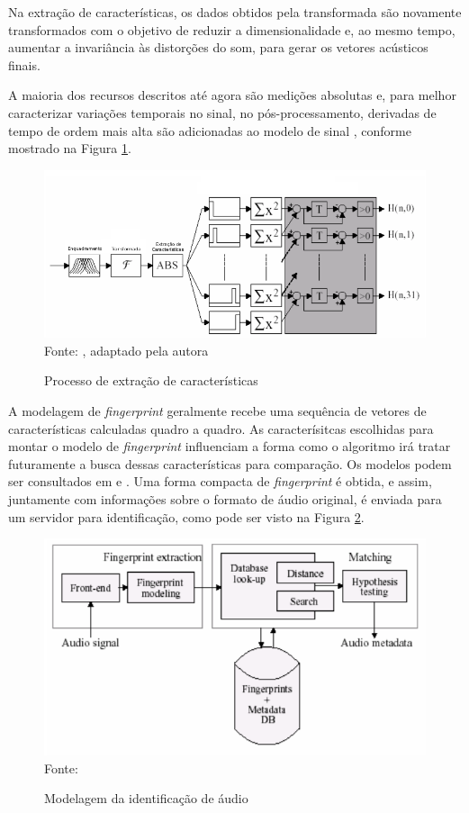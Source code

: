 Na extração de características, os dados obtidos pela transformada são novamente transformados com o objetivo de reduzir a dimensionalidade e, ao mesmo tempo, aumentar a invariância às distorções do som, para gerar os vetores acústicos finais.

A maioria dos recursos descritos até agora são medições absolutas e, para melhor caracterizar variações temporais no sinal, no pós-processamento, derivadas de tempo de ordem mais alta são adicionadas ao modelo de sinal \cite{cano2005}, conforme mostrado na Figura \ref{fig:extCaract}.

\begin{figure}[!htb]
   \centering
   \caption{Processo de extração de características}\label{fig:extCaract} 
   \includegraphics[scale=0.47]{figuras/extCaract.png}
   \\Fonte: \cite{haitsma2002}, adaptado pela autora
\end{figure}

A modelagem de \textit{fingerprint} geralmente recebe uma sequência de vetores de características calculadas quadro a quadro. As caracterísitcas escolhidas para montar o modelo de \textit{fingerprint} influenciam a forma como o algoritmo irá tratar futuramente a busca dessas características para comparação. Os modelos podem ser consultados em \cite{cano2005} e \cite{haitsma2002}. Uma forma compacta de \textit{fingerprint} é obtida, e assim, juntamente com informações sobre o formato de áudio original, é enviada para um servidor para identificação, como pode ser visto na Figura \ref{fig:identAudio}.

\begin{figure}[!htb]
   \centering
   \caption{Modelagem da identificação de áudio}\label{fig:identAudio} 
   \includegraphics[scale=0.62]{figuras/etapasFinger2.png}
   \\Fonte: \cite{henriques2003}
\end{figure}

